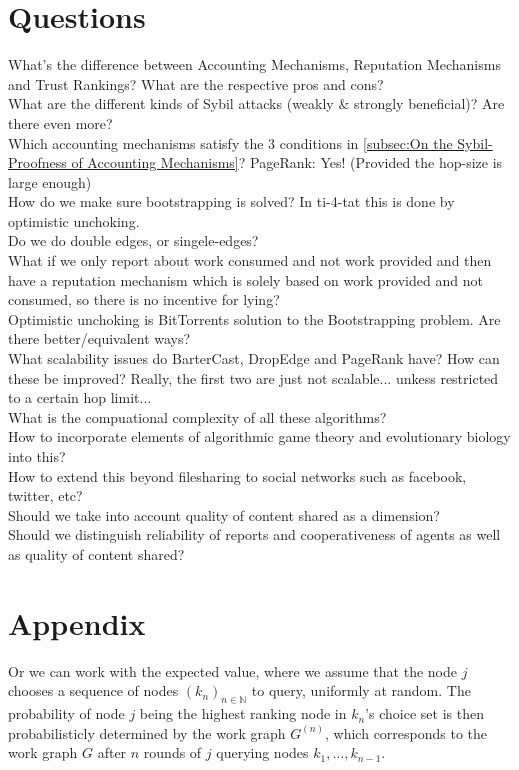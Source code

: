 \documentclass[11pt,a4paper]{article}
\theoremstyle{definition}
\theoremstyle{theorem}
\theoremstyle{proposition}
\theoremstyle{corollary}
\theoremstyle{lemma}
\theoremstyle{example}
\theoremstyle{remark}
\begin{document}
\section{Questions}
\label{sec:Questions}
What's the difference between Accounting Mechanisms, Reputation Mechanisms and Trust Rankings? What are the respective pros and cons?\\
What are the different kinds of Sybil attacks (weakly \& strongly beneficial)? Are there even more?\\
Which accounting mechanisms satisfy the 3 conditions in \ref{subsec:On the Sybil-Proofness of Accounting Mechanisms}? PageRank: Yes! (Provided the hop-size is large enough)\\
How do we make sure bootstrapping is solved? In ti-4-tat this is done by optimistic unchoking.\\
Do we do double edges, or singele-edges?\\
What if we only report about work consumed and not work provided and then have a reputation mechanism which is solely based on work provided and not consumed, so there is no incentive for lying?\\
Optimistic unchoking is BitTorrents solution to the Bootstrapping problem. Are there better/equivalent ways?\\
What scalability issues do BarterCast, DropEdge and PageRank have? How can these be improved? Really, the first two are just not scalable... unkess restricted to a certain hop limit...\\
What is the compuational complexity of all these algorithms?\\
How to incorporate elements of algorithmic game theory and evolutionary biology into this?\\
How to extend this beyond filesharing to social networks such as facebook, twitter, etc?\\
Should we take into account quality of content shared as a dimension?\\
Should we distinguish reliability of reports and cooperativeness of agents as well as quality of content shared?\\









\section{Appendix}
\label{sec:Appendix}
\noindent{}Or we can work with the expected value, where we assume that the node $j$ chooses a sequence of nodes $(k_n)_{n\in\mathbb{N}}$ to query, uniformly at random. The probability of node $j$ being the highest ranking node in $k_n$'s choice set is then probabilisticly determined by the work graph $G^{(n)}$, which corresponds to the work graph $G$ after $n$ rounds of $j$ querying nodes $k_1,\ldots,k_{n-1}$.   
\end{document}
